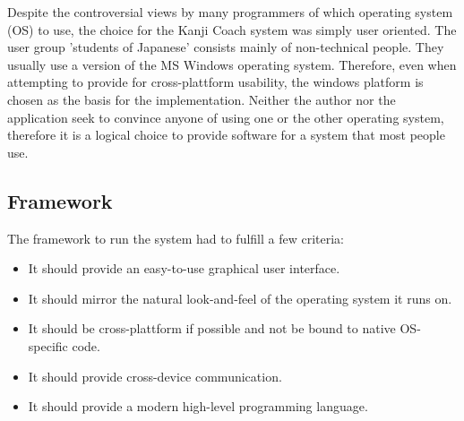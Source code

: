 Despite the controversial views by many programmers of which operating 
system (OS) to use, the choice for the Kanji Coach system was simply user oriented. 
The user group 'students of Japanese' consists mainly of non-technical people. 
They usually use a version of the MS Windows operating system. Therefore, even 
when attempting to provide for cross-plattform usability, 
the windows platform is chosen as the basis for the implementation. 
Neither the author nor the application seek to convince anyone of using one 
or the other operating system, therefore it is a logical choice to provide 
software for a system that most people use.

\subsection{Framework}
\label{sec:framework}

The framework to run the system had to fulfill a few criteria:
\begin{itemize}

  \item It should provide an easy-to-use graphical user interface.

  \item It should mirror the natural look-and-feel of the operating system 
        it runs on.

  \item It should be cross-plattform if possible and not be bound to native
        OS-specific code.

  \item It should provide cross-device communication.

  \item It should provide a modern high-level programming language.

\end{itemize}

